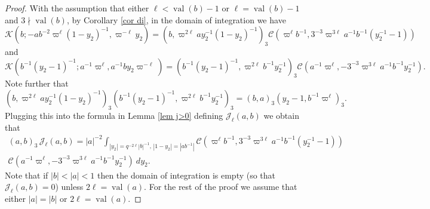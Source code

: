 \documentclass[12pt]{amsart}
\newcommand{\abs}[1]{\left|{#1}\right|}
\newcommand{\J}{\mathcal{J}}
\newcommand{\val}{{\operatorname{val}}}
\newcommand{\Kl}{\mathcal{K}}
\newcommand{\Cu}{\mathcal{C}}
\theoremstyle{remark}
\begin{document}
\begin{proof}
With the assumption that either $\ell<\val(b)-1$ or $\ell=\val(b)-1$ and $3\nmid \val(b)$, by Corollary \ref{cor di}, in the domain of integration we have
\[
\Kl(b;-ab^{-2}\varpi^\ell(1-y_2)^{-1},\varpi^{-\ell} y_2)=(b,\varpi^{2\ell}ay_2^{-1}(1-y_2)^{-1})_3 \Cu(\varpi^\ell b^{-1},3^{-3}\varpi^{3\ell} a^{-1}b^{-1}(y_2^{-1}-1))
\]
and
\[
\Kl(b^{-1}(y_2-1)^{-1};a^{-1}\varpi^\ell ,a^{-1}by_2\varpi^{-\ell} )=(b^{-1}(y_2-1)^{-1},\varpi^{2\ell}b^{-1}y_2^{-1})_3\Cu(a^{-1}\varpi^\ell,-3^{-3}\varpi^{3\ell}a^{-1}b^{-1}y_2^{-1}).
\]
Note further that
\[
(b,\varpi^{2\ell}ay_2^{-1}(1-y_2)^{-1})_3(b^{-1}(y_2-1)^{-1},\varpi^{2\ell}b^{-1}y_2^{-1})_3=(b,a)_3(y_2-1,b^{-1}\varpi^\ell)_3.
\]
Plugging this into the formula in Lemma \ref{lem j>0} defining $\J_\ell(a,b)$ we obtain that
\begin{multline*}
(a,b)_3\,\J_\ell(a,b)=\abs{a}^{-2}\int_{\abs{y_2}=q^{-2\ell}\abs{b}^{-1},\,\abs{1-y_2}=\abs{ab^{-1}}} \Cu(\varpi^\ell b^{-1},3^{-3}\varpi^{3\ell} a^{-1}b^{-1}(y_2^{-1}-1)) \\\Cu(a^{-1}\varpi^\ell,-3^{-3}\varpi^{3\ell}a^{-1}b^{-1}y_2^{-1})\ dy_2.
\end{multline*}
Note that if $\abs{b}<\abs{a}<1$ then the domain of integration is empty (so that $\J_\ell(a,b)=0$) unless $2\ell=\val(a)$. For the rest of the proof we assume that either $\abs{a}=\abs{b}$ or $2\ell=\val(a)$.


\end{proof}
\end{document}
